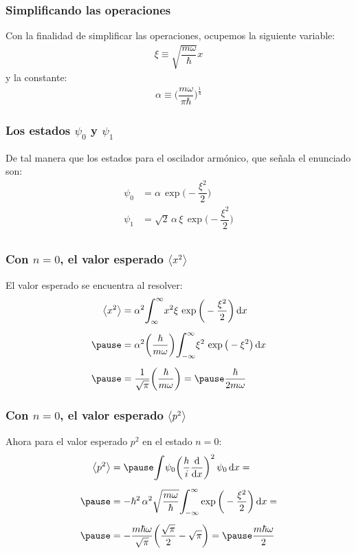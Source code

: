 \documentclass[12pt]{beamer}
\begin{document}
\begin{frame}
\frametitle{Simplificando las operaciones}
Con la finalidad de simplificar las operaciones, \pause ocupemos la siguiente variable:
\pause
\begin{align*}
\xi \equiv \sqrt{\dfrac{m \omega}{\hbar}} x
\end{align*}
\pause
y la constante:
\begin{align*}
\alpha \equiv \bigg( \dfrac{m \omega}{\pi \hbar} \bigg)^{\frac{1}{4}}
\end{align*}
\end{frame}
\begin{frame}
\frametitle{Los estados $\psi_{0}$ y $\psi_{1}$}
De tal manera que los estados para el oscilador armónico, que señala el enunciado son:
\pause
\begin{align*}
\psi_{0} &= \alpha \, \exp\bigg( - \dfrac{\xi^{2}}{2} \bigg) \\[0.5em]
\psi_{1} &= \sqrt{2} \, \alpha \, \xi \, \exp\bigg( - \dfrac{\xi^{2}}{2} \bigg) \\[0.5em]
\end{align*}
\end{frame}
\begin{frame}
\frametitle{Con $n = 0$, el valor esperado $\expval{x^{2}}$}
El valor esperado se encuentra al resolver:
\begin{eqnarray*}
\begin{aligned}
\expval{x^{2}} &= \alpha^{2} \scaleint{6ex}_{\bs \-\infty}^{\infty} x^{2} \xi \, \exp\bigg( - \dfrac{\xi^{2}}{2} \bigg) \dd{x} \\[0.5em] \pause
&= \alpha^{2} \bigg( \dfrac{\hbar}{m \omega} \bigg) \scaleint{6ex}_{\bs -\infty}^{\infty} \xi^{2} \, \exp\big( - \xi^{2} \big) \dd{x} \\[0.5em] \pause
&= \dfrac{1}{\sqrt{\pi}} \bigg( \dfrac{\hbar}{m \omega} \bigg) = \pause \dfrac{\hbar}{2 m \omega}
\end{aligned}
\end{eqnarray*}
\end{frame}
\begin{frame}
\frametitle{Con $n = 0$, el valor esperado $\expval{p^{2}}$}
Ahora para el valor esperado $p^{2}$ en el estado $n = 0$:
\pause
\begin{eqnarray*}
\begin{aligned}
\expval{p^{2}} &= \pause \scaleint{6ex} \psi_{0} \bigg( \dfrac{h}{i} \dv{x} \bigg)^{2} \, \psi_{0} \dd{x} = \\[0.5em] \pause
&= - \hbar^{2} \, \alpha^{2} \sqrt{\dfrac{m \omega}{\hbar}} \scaleint{6ex}_{\bs - \infty}^{\infty} \exp \bigg( - \dfrac{\xi^{2}}{2} \bigg) \dd{x} = \\[0.5em] \pause
&= - \dfrac{m \hbar \omega}{\sqrt{\pi}} \bigg( \dfrac{\sqrt{\pi}}{2} - \sqrt{\pi} \bigg) = \pause \dfrac{m \hbar \omega}{2}
\end{aligned}
\end{eqnarray*}
\end{frame}
\end{document}
